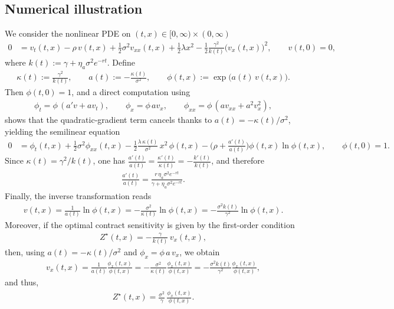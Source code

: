 \documentclass[a4paper,10pt]{article}
\theoremstyle{definition}
\theoremstyle{plain}
\numberwithin{equation}{section}
\begin{document}
 \subsection{Numerical illustration}
We consider the nonlinear PDE on $(t,x)\in[0,\infty)\times(0,\infty)$
\begin{align}
0
&=
v_t(t,x)-\rho\,v(t,x)
+\frac12\sigma^2 v_{xx}(t,x)
+\frac12\lambda x^2
-\frac12\frac{\gamma^2}{k(t)}\big(v_x(t,x)\big)^2,
\qquad
v(t,0)=0,
\label{eq:vPDE}
\end{align}
where $k(t):=\gamma+\eta_a\sigma^2 e^{-rt}$. Define
\begin{align}
\kappa(t):=\frac{\gamma^2}{k(t)},
\qquad
a(t):=-\frac{\kappa(t)}{\sigma^2},
\qquad
\phi(t,x):=\exp\big(a(t)\,v(t,x)\big).
\label{eq:CHdef}
\end{align}
Then $\phi(t,0)=1$, and a direct computation using
\begin{align}
\phi_t=\phi\,(a'v+a v_t),
\qquad
\phi_x=\phi\,a v_x,
\qquad
\phi_{xx}=\phi\,(a v_{xx}+a^2 v_x^2),
\label{eq:CHder}
\end{align}
shows that the quadratic-gradient term cancels thanks to $a(t)=-\kappa(t)/\sigma^2$, yielding the semilinear equation
\begin{align}
0
&=
\phi_t(t,x)
+\frac12\sigma^2 \phi_{xx}(t,x)
-\frac12\frac{\lambda\,\kappa(t)}{\sigma^2}\,x^2\,\phi(t,x)
-\Big(\rho+\frac{a'(t)}{a(t)}\Big)\phi(t,x)\ln\phi(t,x),
\qquad
\phi(t,0)=1.
\label{eq:phiPDE}
\end{align}
Since $\kappa(t)=\gamma^2/k(t)$, one has $\frac{a'(t)}{a(t)}=\frac{\kappa'(t)}{\kappa(t)}=-\frac{k'(t)}{k(t)}$, and therefore
\begin{align}
\frac{a'(t)}{a(t)}
=
\frac{r\,\eta_a\sigma^2 e^{-rt}}{\gamma+\eta_a\sigma^2 e^{-rt}}.
\label{eq:aeff}
\end{align}
Finally, the inverse transformation reads
\begin{align}
v(t,x)=\frac{1}{a(t)}\ln\phi(t,x)
=
-\frac{\sigma^2}{\kappa(t)}\ln\phi(t,x)
=
-\frac{\sigma^2 k(t)}{\gamma^2}\ln\phi(t,x).
\label{eq:CHinv}
\end{align}
Moreover, if the optimal contract sensitivity is given by the first-order condition
\begin{align}
Z^\star(t,x)=-\frac{\gamma}{k(t)}\,v_x(t,x),
\label{eq:ZFOC}
\end{align}
then, using $a(t)=-\kappa(t)/\sigma^2$ and $\phi_x=\phi\,a\,v_x$, we obtain
\begin{align}
v_x(t,x)=\frac{1}{a(t)}\frac{\phi_x(t,x)}{\phi(t,x)}
=-\frac{\sigma^2}{\kappa(t)}\frac{\phi_x(t,x)}{\phi(t,x)}
=-\frac{\sigma^2 k(t)}{\gamma^2}\frac{\phi_x(t,x)}{\phi(t,x)},
\end{align}
and thus,
\begin{align}
Z^\star(t,x)=\frac{\sigma^2}{\gamma}\,\frac{\phi_x(t,x)}{\phi(t,x)}.
\label{eq:Zphi}
\end{align}
\end{document}
